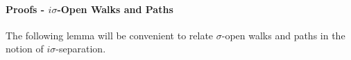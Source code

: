 \paragraph{Proofs - $i\sigma$-Open Walks and Paths}\hfill%

The following lemma will be convenient to relate $\sigma$-open walks and paths in the notion of $i\sigma$-separation.


